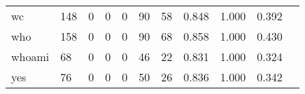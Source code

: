 \begin{longtable}{lp{1.2cm}p{1.2cm}p{1.2cm}p{1.2cm}p{1.2cm}p{1.2cm}p{1.2cm}p{1.2cm}p{1.2cm}p{1.2cm}}
wc        &                                   148 &                                                  0 &                                                  0 &                                                  0 &                                                 90 &                                                 58 &                                              0.848 &                                              1.000 &                                              0.392 \\
who       &                                   158 &                                                  0 &                                                  0 &                                                  0 &                                                 90 &                                                 68 &                                              0.858 &                                              1.000 &                                              0.430 \\
whoami    &                                    68 &                                                  0 &                                                  0 &                                                  0 &                                                 46 &                                                 22 &                                              0.831 &                                              1.000 &                                              0.324 \\
yes       &                                    76 &                                                  0 &                                                  0 &                                                  0 &                                                 50 &                                                 26 &                                              0.836 &                                              1.000 &                                              0.342 \\
\end{longtable}
